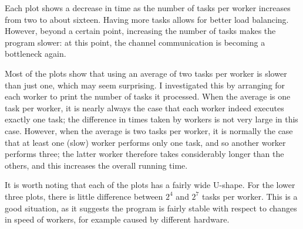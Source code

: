 Each plot shows a decrease in time as the number of tasks per worker increases
from two to about sixteen.  Having more tasks allows for better load
balancing.  However, beyond a certain point, increasing the number of tasks
makes the program slower: at this point, the channel communication is becoming
a bottleneck again.

Most of the plots show that using an average of two tasks per worker is slower
than just one, which may seem surprising.  I investigated this by arranging
for each worker to print the number of tasks it processed.  When the average
is one task per worker, it is nearly always the case that each worker indeed
executes exactly one task; the difference in times taken by workers is not
very large in this case.  However, when the average is two tasks per worker,
it is normally the case that at least one (slow) worker performs only one
task, and so another worker performs three; the latter worker therefore takes
considerably longer than the others, and this increases the overall running
time.

It is worth noting that each of the plots has a fairly wide U-shape.  For the
lower three plots, there is little difference between $2^4$ and $2^7$ tasks
per worker.  This is a good situation, as it suggests the program is fairly
stable with respect to changes in speed of workers, for example caused by
different hardware. 










